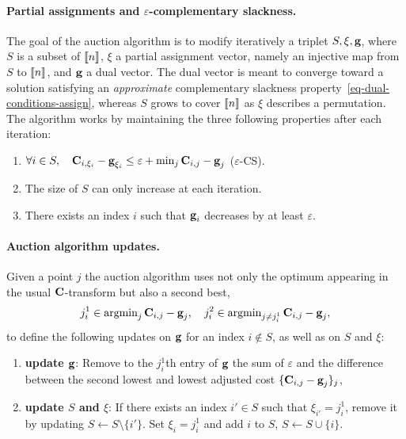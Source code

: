 \paragraph{Partial assignments and $\varepsilon$-complementary slackness.} The goal of the auction algorithm is to modify iteratively a triplet $S,\xi,\mathrm{\textbf{g}}$, where $S$ is a subset of $\llbracket n\rrbracket$, $\xi$ a partial assignment vector, namely an injective map from $S$ to $\llbracket n\rrbracket$, and $\mathrm{\textbf{g}}$ a dual vector. The dual vector is meant to converge toward a solution satisfying an \emph{approximate} complementary slackness property~\eqref{eq-dual-conditions-assign}, whereas $S$ grows to cover $\llbracket n\rrbracket$ as $\xi$ describes a permutation. The algorithm works by maintaining the three following properties after each iteration:
\begin{enumerate}[label={(\alph*)}]
	\item $\forall i\in S,\quad \mathrm{\textbf{C}}_{i,\xi_i} - \mathrm{\textbf{g}}_{\xi_i}  \leq \varepsilon + \min_{j} \mathrm{\textbf{C}}_{i,j} - \mathrm{\textbf{g}}_{j}$ ($\varepsilon$-CS).
	\item The size of $S$ can only increase at each iteration.
	\item There exists an index $i$ such that $\mathrm{\textbf{g}}_i$ decreases by at least $\varepsilon$.
\end{enumerate}

\paragraph{Auction algorithm updates.} Given a point $j$ the auction algorithm uses not only the optimum appearing in the usual $\mathrm{\textbf{C}}$-transform but also a second best,
$$j^1_i \in \operatorname{argmin}_{j} \mathrm{\textbf{C}}_{i,j} - \mathrm{\textbf{g}}_{j}, \quad j^2_i \in \operatorname{argmin}_{j\ne j^1_i} \mathrm{\textbf{C}}_{i,j} - \mathrm{\textbf{g}}_{j}, $$
to define the following updates on $\mathrm{\textbf{g}}$ for an index $i\notin S$, as well as on $S$ and $\xi$:
\begin{enumerate}\item \textbf{update $\mathrm{\textbf{g}}$}: Remove to the $j^1_i$th entry of $\mathrm{\textbf{g}}$ the sum of $\varepsilon$ and the difference between the second lowest and lowest adjusted cost $\{\mathrm{\textbf{C}}_{i,j}-\mathrm{\textbf{g}}_j\}_j$,
\item \textbf{update $S$ and $\xi$}: If there exists an index $i'\in S$ such that $\xi_{i'}=j^1_{i}$, remove it by updating $S\leftarrow S\setminus \{i'\}$. Set $\xi_{i}=j^1_{i}$ and add $i$ to $S$, $S\leftarrow S \cup \{i\}.$
\end{enumerate}


